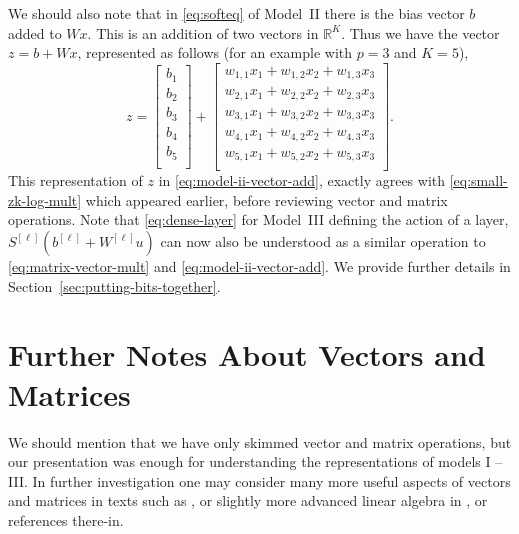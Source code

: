 \documentclass[12pt]{article}
\begin{document}
We should also note that in \eqref{eq:softeq} of Model~II there is the bias vector $b$ added to $Wx$. This is an addition of two vectors in ${\mathbb R}^K$. Thus we have the vector $z = b + Wx$, represented as follows (for an example with $p=3$ and $K=5$),
%
\begin{equation}
\label{eq:model-ii-vector-add} 
z = 
\begin{bmatrix}
b_1 \\
b_2 \\
b_3 \\
b_4 \\
b_5 \\
\end{bmatrix}
+
\begin{bmatrix}
w_{1,1}x_1 + w_{1,2} x_2 + w_{1,3} x_3 \\
w_{2,1}x_1 + w_{2,2} x_2 + w_{2,3} x_3\\
w_{3,1}x_1 + w_{3,2} x_2 + w_{3,3} x_3\\
w_{4,1}x_1 + w_{4,2} x_2 + w_{4,3} x_3\\
w_{5,1}x_1 + w_{5,2} x_2 + w_{5,3} x_3\\
\end{bmatrix}.
\end{equation}
%
This representation of $z$ in \eqref{eq:model-ii-vector-add}, exactly agrees with \eqref{eq:small-zk-log-mult} which appeared earlier, before reviewing vector and matrix operations. Note that \eqref{eq:dense-layer} for Model~III defining the action of a layer, $S^{[\ell]}(b^{[\ell]} + W^{[\ell]} u)$ can now also be understood as a similar operation to \eqref{eq:matrix-vector-mult} and \eqref{eq:model-ii-vector-add}. We provide further details in Section~\ref{sec:putting-bits-together}.

\section{Further Notes About Vectors and Matrices}
\label{sec:further-notes}
We should mention that we have only skimmed vector and matrix operations, but our presentation was enough for understanding the representations of models I -- III. In further investigation one may consider many more useful aspects of vectors and matrices in texts such as \cite{boyd2018introduction}, or slightly more advanced linear algebra in \cite{strang2019linear}, or references there-in. 
\end{document}
